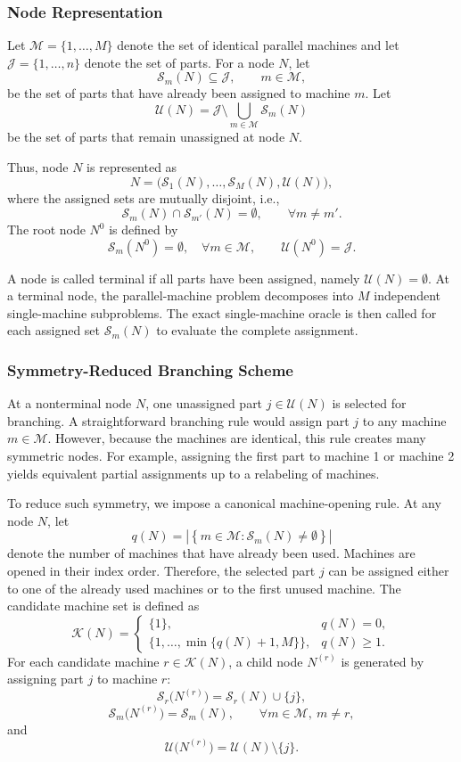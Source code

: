 \documentclass[letterpaper, 10 pt, conference]{ieeeconf}  %
\begin{document}
\subsubsection{Node Representation}

Let $\mathcal{M}=\{1,\dots,M\}$ denote the set of identical parallel machines
and let $\mathcal{J}=\{1,\dots,n\}$ denote the set of parts. For a node $N$,
let
\[
\mathcal{S}_m(N)\subseteq \mathcal{J}, \qquad m\in\mathcal{M},
\]
be the set of parts that have already been assigned to machine $m$. Let
\[
\mathcal{U}(N)=\mathcal{J}\setminus
\bigcup_{m\in\mathcal{M}}\mathcal{S}_m(N)
\]
be the set of parts that remain unassigned at node $N$.

Thus, node $N$ is represented as
\[
N=
\bigl(
\mathcal{S}_1(N),\dots,\mathcal{S}_M(N),\mathcal{U}(N)
\bigr),
\]
where the assigned sets are mutually disjoint, i.e.,
\[
\mathcal{S}_m(N)\cap \mathcal{S}_{m'}(N)=\emptyset,
\qquad \forall m\neq m'.
\]
The root node $N^0$ is defined by
\[
\mathcal{S}_m(N^0)=\emptyset,\quad \forall m\in\mathcal{M},
\qquad
\mathcal{U}(N^0)=\mathcal{J}.
\]

A node is called terminal if all parts have been assigned, namely
$\mathcal{U}(N)=\emptyset$. At a terminal node, the parallel-machine problem
decomposes into $M$ independent single-machine subproblems. The exact
single-machine oracle is then called for each assigned set
$\mathcal{S}_m(N)$ to evaluate the complete assignment.

\subsubsection{Symmetry-Reduced Branching Scheme}

At a nonterminal node $N$, one unassigned part $j\in\mathcal{U}(N)$ is
selected for branching. A straightforward branching rule would assign part
$j$ to any machine $m\in\mathcal{M}$. However, because the machines are
identical, this rule creates many symmetric nodes. For example, assigning
the first part to machine 1 or machine 2 yields equivalent partial
assignments up to a relabeling of machines.

To reduce such symmetry, we impose a canonical machine-opening rule. At any
node $N$, let
\[
q(N)=
\left|
\left\{
m\in\mathcal{M}:\mathcal{S}_m(N)\neq\emptyset
\right\}
\right|
\]
denote the number of machines that have already been used. Machines are
opened in their index order. Therefore, the selected part $j$ can be
assigned either to one of the already used machines or to the first unused
machine. The candidate machine set is defined as
\[
\mathcal{K}(N)=
\begin{cases}
	\{1\}, & q(N)=0,\\[2mm]
	\{1,\dots,\min\{q(N)+1,M\}\}, & q(N)\ge 1.
\end{cases}
\]
For each candidate machine $r\in\mathcal{K}(N)$, a child node $N^{(r)}$ is
generated by assigning part $j$ to machine $r$:
\[
\mathcal{S}_r\bigl(N^{(r)}\bigr)
=
\mathcal{S}_r(N)\cup\{j\},
\]
\[
\mathcal{S}_m\bigl(N^{(r)}\bigr)
=
\mathcal{S}_m(N),
\qquad \forall m\in\mathcal{M},\ m\neq r,
\]
and
\[
\mathcal{U}\bigl(N^{(r)}\bigr)
=
\mathcal{U}(N)\setminus\{j\}.
\]
\end{document}
